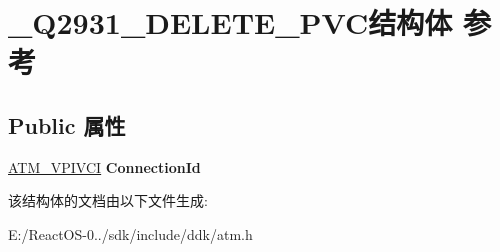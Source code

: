 \hypertarget{struct___q2931___d_e_l_e_t_e___p_v_c}{}\section{\+\_\+\+Q2931\+\_\+\+D\+E\+L\+E\+T\+E\+\_\+\+P\+V\+C结构体 参考}
\label{struct___q2931___d_e_l_e_t_e___p_v_c}
\subsection*{Public 属性}
\begin{DoxyCompactItemize}
\item 
\mbox{\label{struct___q2931___d_e_l_e_t_e___p_v_c_a8ef4c714aa7ef0f9e0d8986a7c353710}} 
\hyperlink{struct___a_t_m___v_p_i_v_c_i}{A\+T\+M\+\_\+\+V\+P\+I\+V\+CI} {\bfseries Connection\+Id}
\end{DoxyCompactItemize}


该结构体的文档由以下文件生成\+:\begin{DoxyCompactItemize}
\item 
E\+:/\+React\+O\+S-\/0../sdk/include/ddk/atm.\+h\end{DoxyCompactItemize}
